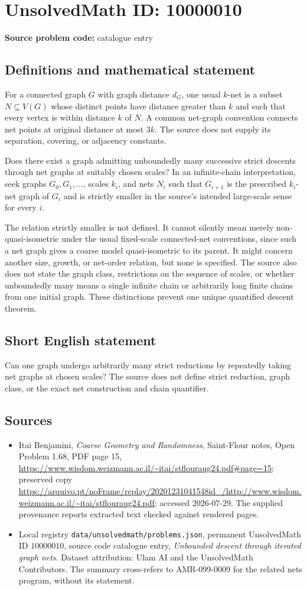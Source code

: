 \documentclass[11pt]{article}
\begin{document}
\section*{UnsolvedMath ID: 10000010}
\textbf{Source problem code:} catalogue entry
\subsection{Definitions and mathematical statement}
For a connected graph $G$ with graph distance $d_G$, one usual $k$-net is a subset $N\subseteq V(G)$ whose distinct points have distance greater than $k$ and such that every vertex is within distance $k$ of $N$. A common net-graph convention connects net points at original distance at most $3k$. The source does not supply its separation, covering, or adjacency constants.

Does there exist a graph admitting unboundedly many successive strict descents through net graphs at suitably chosen scales? In an infinite-chain interpretation, seek graphs $G_0,G_1,\ldots$, scales $k_i$, and nets $N_i$ such that $G_{i+1}$ is the prescribed $k_i$-net graph of $G_i$ and is strictly smaller in the source's intended large-scale sense for every $i$.

The relation strictly smaller is not defined. It cannot silently mean merely non-quasi-isometric under the usual fixed-scale connected-net conventions, since such a net graph gives a coarse model quasi-isometric to its parent. It might concern another size, growth, or net-order relation, but none is specified. The source also does not state the graph class, restrictions on the sequence of scales, or whether unboundedly many means a single infinite chain or arbitrarily long finite chains from one initial graph. These distinctions prevent one unique quantified descent theorem.
\subsection{Short English statement}
Can one graph undergo arbitrarily many strict reductions by repeatedly taking net graphs at chosen scales? The source does not define strict reduction, graph class, or the exact net construction and chain quantifier.
\subsection{Sources}
\begin{itemize}
\item Itai Benjamini, \emph{Coarse Geometry and Randomness}, Saint-Flour notes, Open Problem 1.68, PDF page 15, \url{https://www.wisdom.weizmann.ac.il/~itai/stflouraug24.pdf#page=15}; preserved copy \url{https://arquivo.pt/noFrame/replay/20201231041548id_/http://www.wisdom.weizmann.ac.il/~itai/stflouraug24.pdf}; accessed 2026-07-29. The supplied provenance reports extracted text checked against rendered pages.
\item Local registry \texttt{data/unsolvedmath/problems.json}, permanent UnsolvedMath ID $10000010$, source code catalogue entry, \emph{Unbounded descent through iterated graph nets}. Dataset attribution: Ulam AI and the UnsolvedMath Contributors. The summary cross-refers to AMR-099-0009 for the related nets program, without its statement.
\end{itemize}
\end{document}
